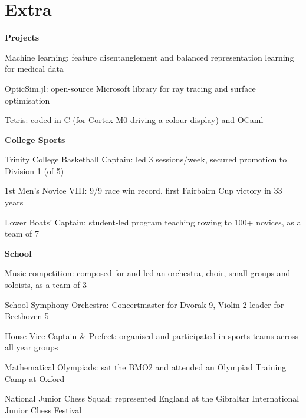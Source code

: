 \documentclass[letterpaper, 10pt]{article}
\begin{document}
\section*{Extra}
\textbf{Projects}
\begin{compact}
	\item Machine learning: feature disentanglement and balanced representation learning for medical data \hfill \href{https://github.com/alfredclwong/ite-feature-selection}{\faGithub}
	\item OpticSim.jl: open-source Microsoft library for ray tracing and surface optimisation \hfill \href{https://github.com/microsoft/OpticSim.jl}{\faGithub}
	\item Tetris: coded in C (for Cortex-M0 driving a colour display) and OCaml \hfill \href{https://github.com/alfredclwong/4b25-tetris}{\faGithub} \href{https://github.com/alfredclwong/tetris-ocaml}{\faGithub}
\end{compact}
\vspace{.5\baselineskip}
\textbf{College Sports}
\begin{compact}
	\item Trinity College Basketball Captain: led 3 sessions/week, secured promotion to Division 1 (of 5)
	\item 1st Men's Novice VIII: 9/9 race win record, first Fairbairn Cup victory in 33 years
	\item Lower Boats' Captain: student-led program teaching rowing to 100+ novices, as a team of 7
\end{compact}
\vspace{.5\baselineskip}
\textbf{School}
\begin{compact}
	\item Music competition: composed for and led an orchestra, choir, small groups and soloists, as a team of 3
	\item School Symphony Orchestra: Concertmaster for Dvorak 9, Violin 2 leader for Beethoven 5
	\item House Vice-Captain \& Prefect: organised and participated in sports teams across all year groups
	\item Mathematical Olympiads: sat the BMO2 and attended an Olympiad Training Camp at Oxford
	\item National Junior Chess Squad: represented England at the Gibraltar International Junior Chess Festival
\end{compact}

\end{document}
